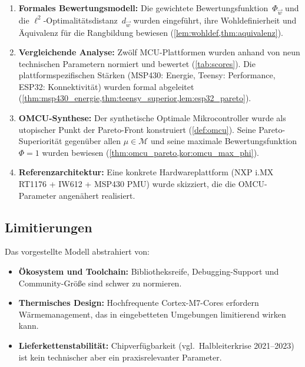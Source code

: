 ﻿\documentclass[12pt, a4paper]{article}
\theoremstyle{plain}
\theoremstyle{definition}
\theoremstyle{remark}
\begin{document}
\begin{enumerate}[label=(\roman*)]
  \item \textbf{Formales Bewertungsmodell:}
        Die gewichtete Bewertungsfunktion~$\Phi_{\vec{w}}$ und die
        $\ell^2$-Optimalitätsdistanz~$d_{\vec{w}}$ wurden eingeführt,
        ihre Wohldefinierheit und Äquivalenz für die Rangbildung bewiesen
        (\cref{lem:wohldef,thm:aquivalenz}).

  \item \textbf{Vergleichende Analyse:}
        Zwölf MCU-Plattformen wurden anhand von neun technischen
        Parametern normiert und bewertet (\cref{tab:scores}).
        Die plattformspezifischen Stärken (MSP430: Energie,
        Teensy: Performance, ESP32: Konnektivität) wurden formal
        abgeleitet (\cref{thm:msp430_energie,thm:teensy_superior,lem:esp32_pareto}).

  \item \textbf{OMCU-Synthese:}
        Der synthetische Optimale Mikrocontroller wurde als utopischer
        Punkt der Pareto-Front konstruiert (\cref{def:omcu}).
        Seine Pareto-Superiorität gegenüber allen $\mu \in \mathcal{M}$
        und seine maximale Bewertungsfunktion~$\Phi = 1$ wurden bewiesen
        (\cref{thm:omcu_pareto,kor:omcu_max_phi}).

  \item \textbf{Referenzarchitektur:}
        Eine konkrete Hardwareplattform (NXP i.MX\,RT1176 + IW612 + MSP430 PMU)
        wurde skizziert, die die OMCU-Parameter angenähert realisiert.
\end{enumerate}

\subsection{Limitierungen}

Das vorgestellte Modell abstrahiert von:
\begin{itemize}
  \item \textbf{Ökosystem und Toolchain:}
        Bibliotheksreife, Debugging-Support und
        Community-Größe sind schwer zu normieren.
  \item \textbf{Thermisches Design:}
        Hochfrequente Cortex-M7-Cores erfordern Wärmemanagement,
        das in eingebetteten Umgebungen limitierend wirken kann.
  \item \textbf{Lieferkettenstabilität:}
        Chipverfügbarkeit (vgl.\ Halbleiterkrise 2021--2023) ist kein
        technischer aber ein praxisrelevanter Parameter.
\end{itemize}
\end{document}
